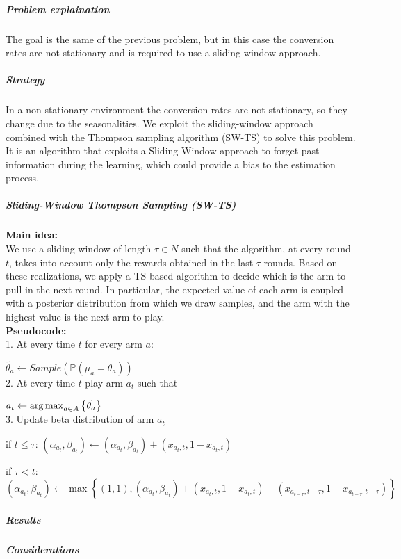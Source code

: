 \subparagraph*{Problem explaination}
The goal is the same of the previous problem, but in this case the conversion rates are not stationary and is required to use a sliding-window approach.
\subparagraph*{Strategy}
In a non-stationary environment the conversion rates are not stationary, so they change due to the seasonalities.
We exploit the sliding-window approach combined with the Thompson sampling algorithm (SW-TS) to solve this problem. It is an algorithm that exploits a Sliding-Window approach to forget past information  during the learning, which could provide a bias to the estimation process.
\subparagraph*{Sliding-Window Thompson Sampling (SW-TS)} 

\textbf{Main idea:}\\
We use a sliding window of length $\tau\in N$ such that the algorithm, at every round $t$, takes into account only the rewards obtained in the last $\tau$ rounds. Based on these realizations, we apply a TS-based algorithm to decide which is the arm to pull in the next round. In particular, the expected value of each arm is coupled with a posterior distribution from which we draw samples, and the arm with the highest value is the next arm to play.\\

\textbf{Pseudocode:}\\

1. At every time $t$ for every arm $a$:

$\tilde{\theta_{a}} \leftarrow Sample(\mathbb P(\mu_{a}=\theta_{a}))$ \\

2. At every time $t$ play arm $a_{t}$ such that 

$a_{t} \leftarrow \operatorname{arg\,max}_{a \in A} \left\{ \tilde{\theta_{a}}  \right\} $ \\

3.  Update beta distribution of arm $a_{t}$

if $t\leq\tau$: $(\alpha_{a_{t}}, \beta_{a_{t}}) \leftarrow (\alpha_{a_{t}}, \beta_{a_{t}}) + (x_{a_{t},t}, 1 - x_{a_{t},t})$ 

if $\tau<t$:	$(\alpha_{a_{t}}, \beta_{a_{t}}) \leftarrow \max \left\{(1,1), (\alpha_{a_{t}}, \beta_{a_{t}}) + (x_{a_{t},t}, 1 - x_{a_{t},t}) - (x_{a_{t-\tau},t-\tau}, 1 - x_{a_{t-\tau},t-\tau})    \right\}$
\subparagraph*{Results}
\subparagraph*{Considerations}